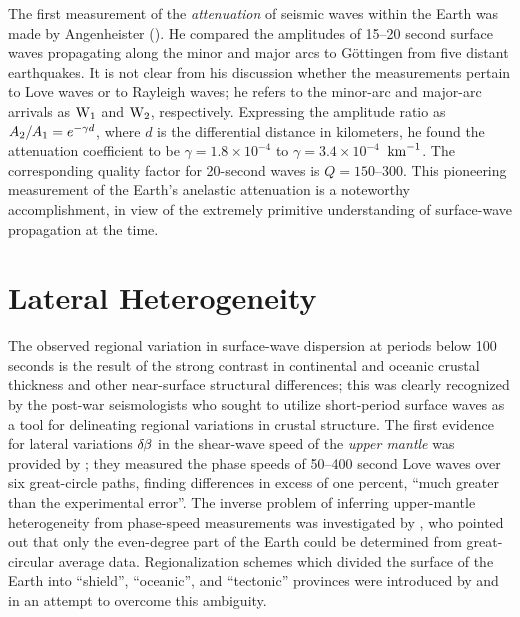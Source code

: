%
%
The first measurement of the {\em attenuation\/} of seismic waves
within the Earth was made by Angenheister (\citeyear{angenheister06}).
He compared the amplitudes of 15--20 second surface waves propagating
along the minor and major arcs to G\"{o}ttingen from five distant earthquakes.
It is not clear from his discussion whether
the measurements pertain to Love waves or to
Rayleigh waves; he refers to the minor-arc and major-arc arrivals as
${\rm W}_1$ and ${\rm W}_2$, respectively.  Expressing the amplitude
ratio as $A_2/\hspace{-0.2 mm}A_1=e^{-\gamma d}$,
where $d$ is the differential distance
in kilometers, he found the attenuation coefficient to be
$\gamma = 1.8\times 10^{-4}$ to $\gamma = 3.4\times 10^{-4}$~${\rm km}^{-1}$.
The corresponding quality factor for 20-second waves is $Q=150$--300.
This pioneering measurement of the Earth's anelastic attenuation is a
noteworthy accomplishment, in view of the extremely primitive understanding
of surface-wave propagation at the time.
%
%
%

\section{Lateral Heterogeneity}
%

The observed regional variation in surface-wave dispersion at
periods below 100 seconds is the result of the strong contrast
in continental and oceanic crustal thickness and other near-surface
structural differences; this was clearly recognized by the post-war
seismologists who sought to utilize short-period surface waves
as a tool for delineating regional variations
in crustal structure.  The first evidence for lateral variations
$\delta\hspace{-0.2 mm}\beta$ in the shear-wave speed of the
{\em upper mantle\/} was provided by \textcite{toksoz&ben-menahem63};
they measured the phase speeds of
50--400 second Love waves over six great-circle paths, finding
differences in excess of one percent, ``much greater than the
experimental error''.  The inverse problem of inferring upper-mantle
heterogeneity from phase-speed measurements was investigated by
\textcite{backus64}, who pointed out that only the even-degree part
of the Earth could be determined from great-circular average data.
Regionalization schemes which divided the surface of the Earth into
``shield'', ``oceanic'', and ``tectonic'' provinces were introduced
by \textcite{toksoz&anderson66} and \textcite{kanamori70} in an
attempt to overcome this ambiguity.

